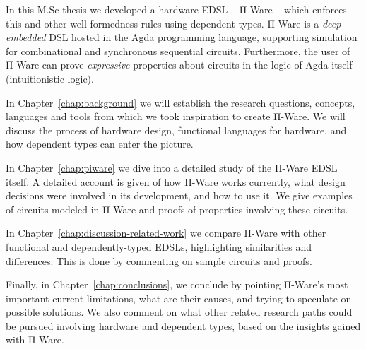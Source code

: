     In this M.Sc thesis we developed a hardware \ac{EDSL} – Π-Ware – which enforces this and other
    well-formedness rules using dependent types.
    Π-Ware is a \emph{deep-embedded} \ac{DSL} hosted in the Agda programming language,
    supporting simulation for combinational and synchronous sequential circuits.
    Furthermore, the user of Π-Ware can prove \emph{expressive} properties about circuits in the logic
    of Agda itself (intuitionistic logic).

    In Chapter~\ref{chap:background} we will establish the research questions, concepts,
    languages and tools from which we took inspiration to create Π-Ware.
    We will discuss the process of hardware design, functional languages for hardware,
    and how dependent types can enter the picture.

    In Chapter~\ref{chap:piware} we dive into a detailed study of the Π-Ware \ac{EDSL} itself.
    A detailed account is given of how Π-Ware works currently,
    what design decisions were involved in its development, and how to use it.
    We give examples of circuits modeled in Π-Ware and proofs of properties involving these circuits.

    In Chapter~\ref{chap:discussion-related-work} we compare Π-Ware with other functional
    and dependently-typed \acp{EDSL}, highlighting similarities and differences.
    This is done by commenting on sample circuits and proofs.

    Finally, in Chapter~\ref{chap:conclusions}, we conclude by pointing Π-Ware's most important
    current limitations, what are their causes, and trying to speculate on possible solutions.
    We also comment on what other related research paths could be pursued involving
    hardware and dependent types, based on the insights gained with Π-Ware.

